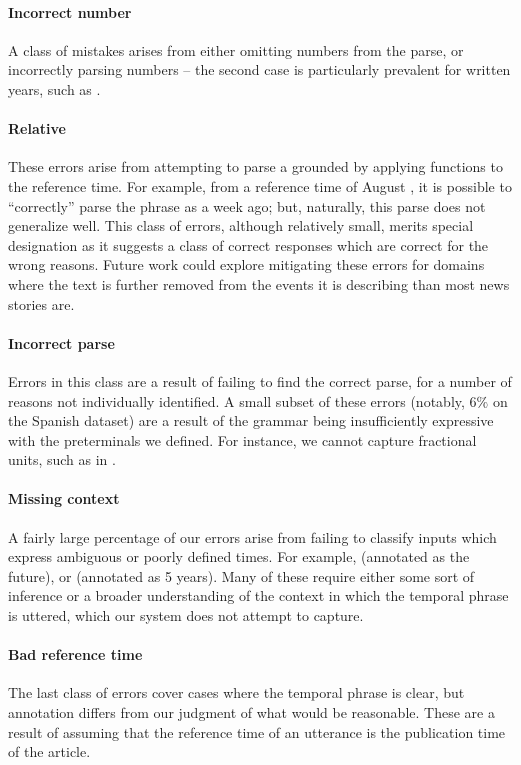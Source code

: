 \paragraph{Incorrect number}
A class of mistakes arises from either omitting numbers from the parse,
  or incorrectly parsing numbers -- the second case is particularly prevalent
  for written years, such as .

\paragraph{Relative }
These errors arise from attempting to parse a grounded  by applying
  functions to the reference time.
For example, from a reference time of August , it is possible to
  ``correctly''
  parse the phrase  as a week ago; but, naturally, this parse does
  not generalize well.
This class of errors, although relatively small, merits special designation
  as it suggests a class of correct responses which are correct for the wrong
  reasons.
Future work could explore mitigating these errors for domains
  where the text is further removed from the events it is describing
  than most news stories are.

\paragraph{Incorrect parse}
Errors in this class are a result of failing to find the correct parse,
  for a number of reasons not individually identified.
A small subset of these errors (notably, $6\%$ on the Spanish dataset)
  are a result of the grammar being insufficiently expressive with the
  preterminals we defined.
For instance, we cannot capture fractional units,
  such as in .

\paragraph{Missing context}
A fairly large percentage of our errors arise from failing to classify inputs
  which express ambiguous or poorly defined times.
For example,  (annotated as the future), or 
  (annotated as 5 years).
Many of these require either some sort of inference or
  a broader understanding of the context in which the
  temporal phrase is uttered, which our system does not attempt to capture.

\paragraph{Bad reference time}
The last class of errors cover cases where the temporal phrase is clear,
  but annotation differs from our judgment of what would be reasonable.
These are a result of assuming that the reference time of an utterance is
  the publication time of the article.
